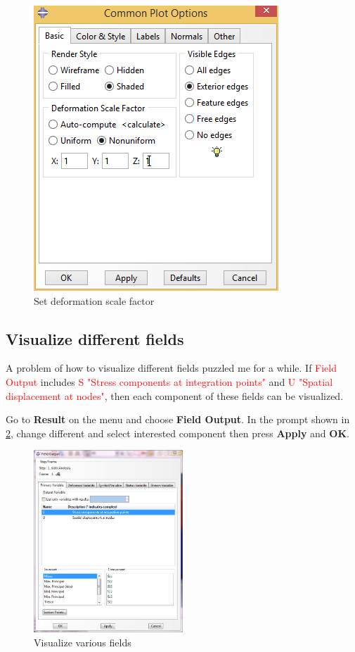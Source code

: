 \documentclass[10pt,a4paper]{article}
\begin{document}
\begin{figure}[h]
\centering
\includegraphics[width=0.7\linewidth]{Set_deformation_scale_factor.png}
\caption{Set deformation scale factor} \label{fig:Set deformation scale factor}
\end{figure}

\subsection{Visualize different fields}
A problem of how to visualize different fields puzzled me for a while. If \textcolor{red}{Field Output} includes \textcolor{red}{S "Stress components at integration points"} and \textcolor{red}{U "Spatial displacement at nodes"}, then each component of these fields can be visualized.

Go to \textbf{Result} on the menu and choose \textbf{Field Output}. In the prompt shown in \cref{fig: visualize various fields}, change different and select interested component then press \textbf{Apply} and \textbf{OK}.

\begin{figure}[h]
\centering
\includegraphics[width=0.5\textwidth]{visualize_various_fields.png}
\caption{Visualize various fields} \label{fig: visualize various fields}
\vspace{\baselineskip}
\end{figure}
\end{document}
